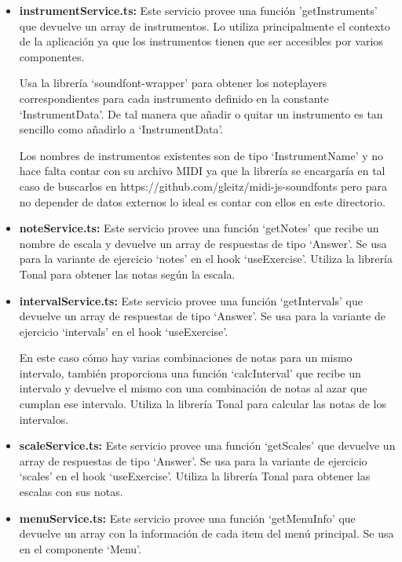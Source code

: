 \documentclass[12pt,twoside,titlepage]{report}
\begin{document}
\begin{itemize}
    \item \textbf{instrumentService.ts:} Este servicio provee una función 'getInstruments' que devuelve un array de instrumentos. Lo utiliza principalmente el contexto de la aplicación ya que los instrumentos tienen que ser accesibles por varios componentes.
    
        Usa la librería ‘soundfont-wrapper’ para obtener los noteplayers correspondientes para cada instrumento definido en la constante ‘InstrumentData’. De tal manera que añadir o quitar un instrumento es tan sencillo como añadirlo a ‘InstrumentData’. 
        
        Los nombres de instrumentos existentes son de tipo ‘InstrumentName’ y no hace falta contar con su archivo MIDI ya que la librería se encargaría en tal caso de buscarlos en https://github.com/gleitz/midi-js-soundfonts pero para no depender de datos externos lo ideal es contar con ellos en este directorio.
    
    \item \textbf{noteService.ts:} Este servicio provee una función ‘getNotes’ que recibe un nombre de escala y devuelve un array de respuestas de tipo ‘Answer’. Se usa para la variante de ejercicio ‘notes’ en el hook ‘useExercise’. Utiliza la librería Tonal para obtener las notas según la escala.
    \item \textbf{intervalService.ts:} Este servicio provee una función ‘getIntervals’ que devuelve un array de respuestas de tipo ‘Answer’. Se usa para la variante de ejercicio ‘intervals’ en el hook  ‘useExercise’. 
    
        En este caso cómo hay varias combinaciones de notas para un mismo intervalo, también proporciona una función ‘calcInterval’ que recibe un intervalo y devuelve el mismo con una combinación de notas al azar que cumplan ese intervalo. Utiliza la librería Tonal para calcular las notas de los intervalos.
    
    \item \textbf{scaleService.ts:} Este servicio provee una función ‘getScales’ que devuelve un array de respuestas de tipo ‘Answer’. Se usa para la variante de ejercicio ‘scales’ en el hook  ‘useExercise’. Utiliza la librería Tonal para obtener las escalas con sus notas.
    \item \textbf{menuService.ts:} Este servicio provee una función ‘getMenuInfo’ que devuelve un array con la información de cada item del menú principal. Se usa en el componente ‘Menu’.
\end{itemize}
\end{document}
